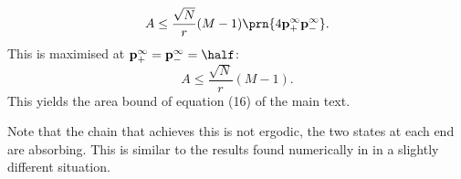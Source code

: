\documentclass{article} %
\newcommand{\pr}{\mathbf{p}}
\newcommand{\eq}{\pr^\infty}
\begin{document}
%
\begin{equation}\label{eq:multistateextarea}
  A \leq \frac{\sqrt{N}}{r}(M-1)\prn{4\eq_+\eq_-}.
\end{equation}
%
This is maximised at $\eq_+=\eq_-=\half$:
%
\begin{equation}\label{eq:maxarea}
  A \leq \frac{\sqrt{N}}{r}(M-1).
\end{equation}
%
This yields the area bound of equation (16) of the main text.

Note that the chain that achieves this is not ergodic, the two states at each end are absorbing. This is similar to the results found numerically in \cite{Barrett2008discrete} in a slightly different situation.







\end{document}
